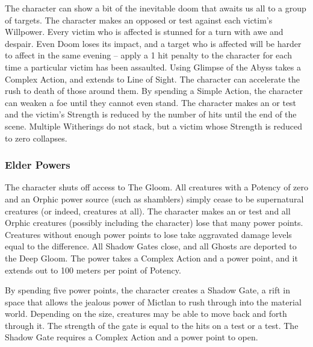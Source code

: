  The character can show a bit of the inevitable doom that awaits us all to a group of targets. The character makes an opposed  or  test against each victim's Willpower. Every victim who is affected is stunned for a turn with awe and despair. Even Doom loses its impact, and a target who is affected will be harder to affect in the same evening -- apply a 1 hit penalty to the character for each time a particular victim has been assaulted. Using Glimpse of the Abyss takes a Complex Action, and extends to Line of Sight.
 The character can accelerate the rush to death of those around them. By spending a Simple Action, the character can weaken a foe until they cannot even stand. The character makes an  or  test and the victim's Strength is reduced by the number of hits until the end of the scene. Multiple Witherings do not stack, but a victim whose Strength is reduced to zero collapses.

\subsubsection{Elder Powers}

 The character shuts off access to The Gloom. All creatures with a Potency of zero and an Orphic power source (such as shamblers) simply cease to be supernatural creatures (or indeed, creatures at all). The character makes an  or  test and all Orphic creatures (possibly including the character) lose that many power points. Creatures without enough power points to lose take aggravated damage levels equal to the difference. All Shadow Gates close, and all Ghosts are deported to the Deep Gloom. The power takes a Complex Action and a power point, and it extends out to 100 meters per point of Potency.

 By spending five power points, the character creates a Shadow Gate, a rift in space that allows the jealous power of Mictlan to rush through into the material world. Depending on the size, creatures may be able to move back and forth through it. The strength of the gate is equal to the hits on a  test or a  test. The Shadow Gate requires a Complex Action and a power point to open.


